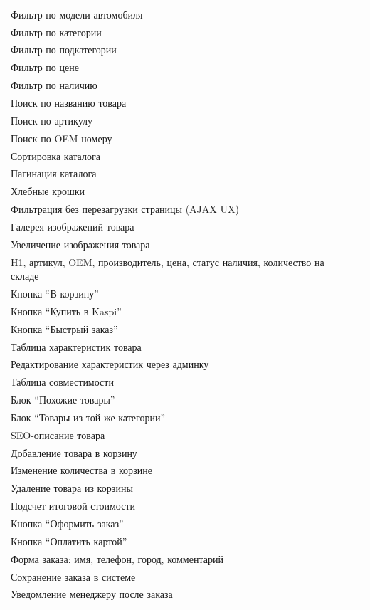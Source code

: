 \documentclass[12pt,a4paper]{article}
\newcommand{\done}{\ding{51}}
\begin{document}
\begin{longtable}{>{\raggedright\arraybackslash}p{} >{\centering\arraybackslash}p{}}
Фильтр по модели автомобиля & \done \\
Фильтр по категории & \done \\
Фильтр по подкатегории & \done \\
Фильтр по цене & \done \\
Фильтр по наличию & \done \\
Поиск по названию товара & \done \\
Поиск по артикулу & \done \\
Поиск по OEM номеру & \done \\
Сортировка каталога & \done \\
Пагинация каталога & \done \\
Хлебные крошки & \done \\
Фильтрация без перезагрузки страницы (AJAX UX) & \done \\

Галерея изображений товара & \done \\
Увеличение изображения товара & \done \\
H1, артикул, OEM, производитель, цена, статус наличия, количество на складе & \done \\
Кнопка ``В корзину'' & \done \\
Кнопка ``Купить в Kaspi'' & \done \\
Кнопка ``Быстрый заказ'' & \done \\
Таблица характеристик товара & \done \\
Редактирование характеристик через админку & \done \\
Таблица совместимости & \done \\
Блок ``Похожие товары'' & \done \\
Блок ``Товары из той же категории'' & \done \\
SEO-описание товара & \done \\

Добавление товара в корзину & \done \\
Изменение количества в корзине & \done \\
Удаление товара из корзины & \done \\
Подсчет итоговой стоимости & \done \\
Кнопка ``Оформить заказ'' & \done \\
Кнопка ``Оплатить картой'' & \done \\

Форма заказа: имя, телефон, город, комментарий & \done \\
Сохранение заказа в системе & \done \\
Уведомление менеджеру после заказа & \done \\


\end{longtable}
\end{document}
